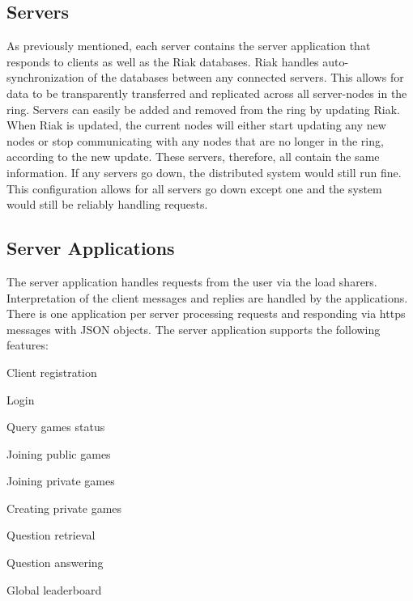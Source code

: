 \documentclass{dependencies/acm_proc_article-sp}
\begin{document}
\subsection{Servers}
As previously mentioned, each server contains the server application that responds to clients as well as the Riak databases.
Riak handles auto-synchronization of the databases between any connected servers.
This allows for data to be transparently transferred and replicated across all server-nodes in the ring.
Servers can easily be added and removed from the ring by updating Riak.
When Riak is updated, the current nodes will either start updating any new nodes or stop communicating with any nodes that are no longer in the ring, according to the new update.
These servers, therefore, all contain the same information.
If any servers go down, the distributed system would still run fine.
This configuration allows for all servers go down except one and the system would still be reliably handling requests.

\subsection{Server Applications}
The server application handles requests from the user via the load sharers.
Interpretation of the client messages and replies are handled by the applications. There is one application per server processing requests and responding via https messages with JSON objects.
The server application supports the following features:
\begin{itemized}
\item Client registration
\item Login
\item Query games status
\item Joining public games
\item Joining private games
\item Creating private games
\item Question retrieval
\item Question answering
\item Global leaderboard
\end{itemized}
\end{document}
